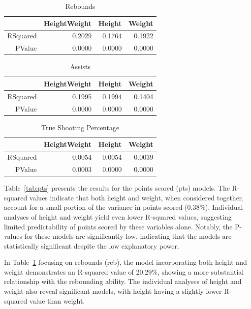 \documentclass[12pt]{article}
\begin{document}
\begin{table}[h]
\caption{Rebounds}
\label{tab:reb}
\centering
\begin{tabular}{rrrr}
  \hline
 & HeightWeight & Height & Weight \\ 
  \hline
RSquared & 0.2029 & 0.1764 & 0.1922 \\ 
  PValue & 0.0000 & 0.0000 & 0.0000 \\ 
   \hline
\end{tabular}
\end{table}

\begin{table}[h]
\caption{Assists}
\label{tab:ast}
\centering
\begin{tabular}{rrrr}
  \hline
 & HeightWeight & Height & Weight \\ 
  \hline
RSquared & 0.1995 & 0.1994 & 0.1404 \\ 
  PValue & 0.0000 & 0.0000 & 0.0000 \\ 
   \hline
\end{tabular}
\end{table}
 
\begin{table}[h!]
\caption{True Shooting Percentage}
\label{tab:ts}
\centering
\begin{tabular}{rrrr}
  \hline
 & HeightWeight & Height & Weight \\ 
  \hline
RSquared & 0.0054 & 0.0054 & 0.0039 \\ 
  PValue & 0.0003 & 0.0000 & 0.0000 \\ 
   \hline
\end{tabular}
\end{table}

Table~\ref{tab:pts} presents the results for the points scored (pts) models. The R-squared values indicate that 
both height and weight, when considered together, account for a small portion of the variance in points scored (0.38\%). 
Individual analyses of height and weight yield even lower R-squared values, suggesting limited predictability of 
points scored by these variables alone. Notably, the P-values for these models are significantly low, indicating 
that the models are statistically significant despite the low explanatory power.

In Table~\ref{tab:reb} focusing on rebounds (reb), the model incorporating both height and weight demonstrates 
an R-squared value of 20.29\%, showing a more substantial relationship with the rebounding ability. The individual 
analyses of height and weight also reveal significant models, with height having a slightly lower R-squared value 
than weight.
\end{document}
